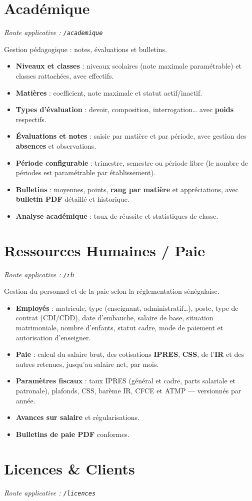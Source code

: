 \documentclass[11pt,a4paper]{report}
\newcommand{\feat}[1]{\item #1}
\newcommand{\modtag}[1]{{\small\color{sagigray}\textit{Route applicative : \texttt{#1}}}}
\begin{document}
\section{Académique}
\modtag{/academique}

\noindent Gestion pédagogique : notes, évaluations et bulletins.
\begin{itemize}
\feat{\textbf{Niveaux et classes} : niveaux scolaires (note maximale
paramétrable) et classes rattachées, avec effectifs.}
\feat{\textbf{Matières} : coefficient, note maximale et statut actif/inactif.}
\feat{\textbf{Types d'évaluation} : devoir, composition, interrogation\ldots
avec \textbf{poids} respectifs.}
\feat{\textbf{Évaluations et notes} : saisie par matière et par période, avec
gestion des \textbf{absences} et observations.}
\feat{\textbf{Période configurable} : trimestre, semestre ou période libre
(le nombre de périodes est paramétrable par établissement).}
\feat{\textbf{Bulletins} : moyennes, points, \textbf{rang par matière} et
appréciations, avec \textbf{bulletin PDF} détaillé et historique.}
\feat{\textbf{Analyse académique} : taux de réussite et statistiques de classe.}
\end{itemize}

\section{Ressources Humaines / Paie}
\modtag{/rh}

\noindent Gestion du personnel et de la paie selon la réglementation
sénégalaise.
\begin{itemize}
\feat{\textbf{Employés} : matricule, type (enseignant, administratif\ldots),
poste, type de contrat (CDI/CDD), date d'embauche, salaire de base, situation
matrimoniale, nombre d'enfants, statut cadre, mode de paiement et
autorisation d'enseigner.}
\feat{\textbf{Paie} : calcul du salaire brut, des cotisations
\textbf{IPRES}, \textbf{CSS}, de l'\textbf{IR} et des autres retenues, jusqu'au
salaire net, par mois.}
\feat{\textbf{Paramètres fiscaux} : taux IPRES (général et cadre, parts
salariale et patronale), plafonds, CSS, barème IR, CFCE et ATMP --- versionnés
par année.}
\feat{\textbf{Avances sur salaire} et régularisations.}
\feat{\textbf{Bulletins de paie PDF} conformes.}
\end{itemize}

\section{Licences \& Clients}
\modtag{/licences}
\end{document}

